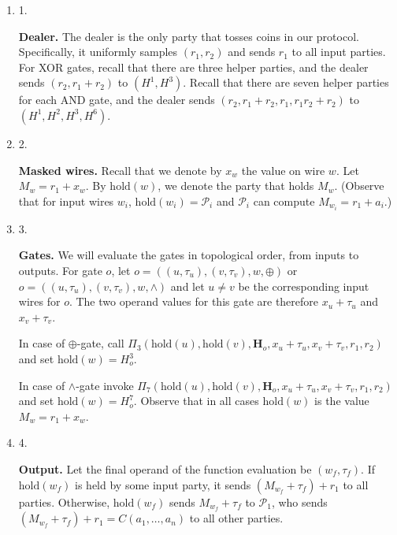 \documentclass[10pt,a4paper]{article}
\begin{document}
\begin{enumerate}


\item[] 
1. 


\textbf{Dealer.}
The dealer is the only party that tosses coins in our protocol. Specifically, it uniformly samples $(r_{1},r_{2})$ and sends $r_{1}$ to all
input parties. For XOR gates, recall that there are three helper parties, and the dealer sends
$(r_{2},r_{1}+r_{2})$ to $(H^{1},H^{3})$. Recall that there are seven helper parties for each AND gate, and the dealer sends
$(r_{2},r_{1}+r_{2},r_{1},r_{1}r_{2}+r_{2})$ to $(H^{1},H^{2},H^{3},H^{6})$.\par





\item[] 
2. 


\textbf{Masked wires.}
Recall that we denote by $x_{w}$ the value on wire $w$. Let
$M_{w}=r_{1}+x_{w}$. By $\mathrm{hold}(w)$, we denote the party that holds $M_{w}$.
(Observe that for input wires $w_{i}$,
$\mathrm{hold}(w_{i})=\mathcal{P}_{i}$ and $\mathcal{P}_{i}$ can compute $M_{w_{i}}=r_{1}+a_{i}$.)\par





\item[] 
3. 


\textbf{Gates.}
We will evaluate the gates in topological order, from inputs to outputs. For gate $o$, let
$o=((u,\tau_{u}),(v,\tau_{v}),w,\oplus)$ or
$o=((u,\tau_{u}),(v,\tau_{v}),w,\wedge)$ and let $u\neq v$ be the corresponding input wires for $o$.
The two operand values for this gate are therefore $x_{u}+\tau_{u}$ and $x_{v}+\tau_{v}$.\par




In case of $\oplus$-gate, call
$\Pi_{3}(\mathrm{hold}(u),\mathrm{hold}(v),\mathbf{H}_{o},x_{u}+\tau_{u},x_{v}+\tau_{v},r_{1},r_{2})$ and set
$\mathrm{hold}(w)=H_{o}^{3}$.\par




In case of $\wedge$-gate invoke
$\Pi_{7}(\mathrm{hold}(u),\mathrm{hold}(v),\mathbf{H}_{o},x_{u}+\tau_{u},x_{v}+\tau_{v},r_{1},r_{2})$ and set
$\mathrm{hold}(w)=H_{o}^{7}$.
Observe that in all cases $\mathrm{hold}(w)$ is the value $M_{w}=r_{1}+x_{w}$.\par





\item[] 
4. 


\textbf{Output.}
Let the final operand of the function evaluation be $(w_{f},\tau_{f})$.
If $\mathrm{hold}(w_{f})$ is held by some input party, it sends
$(M_{w_{f}}+\tau_{f})+r_{1}$ to all parties. Otherwise, $\mathrm{hold}(w_{f})$ sends
$M_{w_{f}}+\tau_{f}$ to $\mathcal{P}_{1}$, who sends
$(M_{w_{f}}+\tau_{f})+r_{1}=C(a_{1},\ldots,a_{n})$ to all other parties.\par





\end{enumerate}
\end{document}
